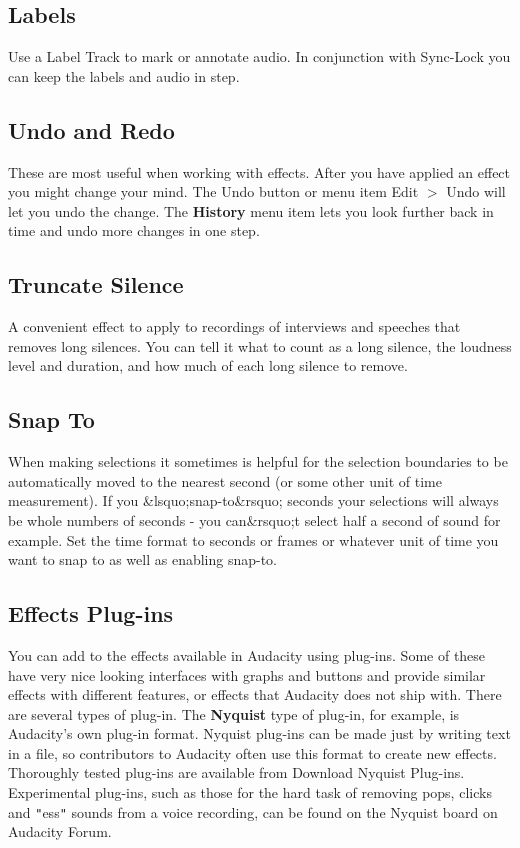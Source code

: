 \documentclass[twocolumn]{book}
\begin{document}
\subsection{Labels}


Use a Label Track to mark or annotate audio.  In conjunction with Sync-Lock you can keep the labels and audio in step.

\subsection{Undo and Redo}


These are most useful when working with effects.  After you have applied an effect you might change your mind.  The Undo button or menu item Edit \mbox{$>$} Undo will let you undo the change. The \textbf{History} menu item lets you look further back in time and undo more changes in one step.

\subsection{Truncate Silence}


A convenient effect to apply to recordings of interviews and speeches that removes long silences.  You can tell it what to count as a long silence, the loudness level and duration, and how much of each long silence to remove.

\subsection{Snap To}


When making selections it sometimes is helpful for the selection boundaries to be automatically moved to the nearest second (or some other unit of time measurement).  If you \&lsquo;snap-to\&rsquo; seconds your selections will always be whole numbers of seconds - you can\&rsquo;t select half a second of sound for example.  Set the time format to seconds or frames or whatever unit of time you want to snap to as well as enabling snap-to.

\subsection{Effects Plug-ins}


You can add to the effects available in Audacity using plug-ins.  Some of these have very nice looking interfaces with graphs and buttons and provide similar effects with different features, or effects that Audacity does not ship with. There are several types of plug-in. The \textbf{Nyquist} type of plug-in, for example, is Audacity's own plug-in format. Nyquist plug-ins can be made just by writing text in a file, so contributors to Audacity often use this format to create new effects. Thoroughly tested plug-ins are available from Download Nyquist Plug-ins. Experimental plug-ins, such as those for the hard task of removing pops, clicks and \texttt{{}"{}}ess\texttt{{}"{}} sounds from a voice recording, can be found on the Nyquist board on Audacity Forum.
\end{document}

